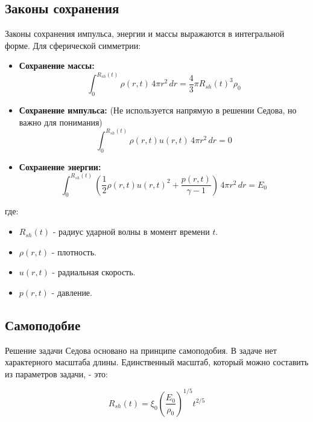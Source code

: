 \documentclass[a4paper,12pt]{extarticle}
\begin{document}
\subsection{Законы сохранения}

Законы сохранения импульса, энергии и массы выражаются в интегральной форме.  Для сферической симметрии:

\begin{itemize}
    \item \textbf{Сохранение массы:}
    \begin{equation}
        \int_0^{R_{sh}(t)} \rho(r, t) \, 4\pi r^2 \, dr = \frac{4}{3}\pi R_{sh}(t)^3 \rho_0
    \end{equation}

    \item \textbf{Сохранение импульса:} (Не используется напрямую в решении Седова, но важно для понимания)
    \begin{equation}
        \int_0^{R_{sh}(t)} \rho(r, t) u(r, t) \, 4\pi r^2 \, dr = 0
    \end{equation}

    \item \textbf{Сохранение энергии:}
    \begin{equation}
        \int_0^{R_{sh}(t)} \left( \frac{1}{2}\rho(r, t) u(r, t)^2 + \frac{p(r, t)}{\gamma - 1} \right) \, 4\pi r^2 \, dr = E_0
    \end{equation}
\end{itemize}
где:
\begin{itemize}
    \item $R_{sh}(t)$ - радиус ударной волны в момент времени $t$.
    \item $\rho(r, t)$ - плотность.
    \item $u(r, t)$ - радиальная скорость.
    \item $p(r, t)$ - давление.
\end{itemize}


\subsection{Самоподобие}

Решение задачи Седова основано на принципе самоподобия.  В задаче нет характерного масштаба длины.  Единственный масштаб, который можно составить из параметров задачи, - это:

\begin{equation}
    R_{sh}(t) = \xi_0 \left( \frac{E_0}{\rho_0} \right)^{1/5} t^{2/5}
\end{equation}
\end{document}
